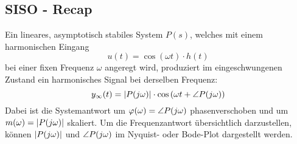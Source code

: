 \subsection{SISO - Recap}
    Ein lineares, asymptotisch stabiles System $P(s)$, welches mit einem harmonischen Eingang
    \begin{equation*}
        u(t) = \cos\left(\omega t\right) \cdot h(t)
    \end{equation*}
    bei einer fixen Frequenz $\omega$ angeregt wird, produziert im eingeschwungenen Zustand ein harmonisches Signal bei derselben Frequenz:
    \begin{equation*}
        y_\infty(t) = |P(j\omega)|\cdot\cos\left(\omega t + \angle P(j\omega)\right)
    \end{equation*}
    Dabei ist die Systemantwort um $\varphi(\omega) = \angle P(j\omega)$ phasenverschoben und um $ m(\omega) = |P(j\omega)|$ skaliert. Um die Frequenzantwort übersichtlich darzustellen, können $|P(j\omega)|$ und $\angle P(j\omega)$ im Nyquist- oder Bode-Plot dargestellt werden.